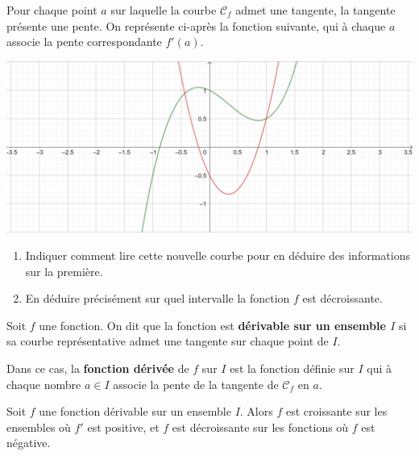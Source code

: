 \documentclass{article}
\begin{document}
Pour chaque point $a$ sur laquelle la courbe $\mathcal{C}_f$ admet une tangente, la tangente présente une pente. On représente ci-après la fonction suivante, qui à chaque $a$ associe la pente correspondante $f'(a)$.

\begin{center}
\includegraphics[width=\textwidth]{Courbe_2.png}
\end{center}

\begin{enumerate}
\item Indiquer comment lire cette nouvelle courbe pour en déduire des informations sur la première.

\answersline

\item En déduire précisément sur quel intervalle la fonction $f$ est décroissante.

\answersline
\end{enumerate}

\begin{tcolorbox}
\begin{definition}
Soit $f$ une fonction. On dit que la fonction est \textbf{dérivable sur un ensemble $I$} si sa courbe représentative admet une tangente sur chaque point de $I$.

Dans ce cas, la \textbf{fonction dérivée} de $f$ sur $I$ est la fonction définie sur $I$ qui à chaque nombre $a \in I$ associe la pente de la tangente de $\mathcal{C}_f$ en $a$.
\end{definition}
\end{tcolorbox}
\begin{proposition}
Soit $f$ une fonction dérivable sur un ensemble $I$. Alors $f$ est croissante sur les ensembles où $f'$ est positive, et $f$ est décroissante sur les fonctions où $f$ est négative.
\end{proposition}
\end{document}
